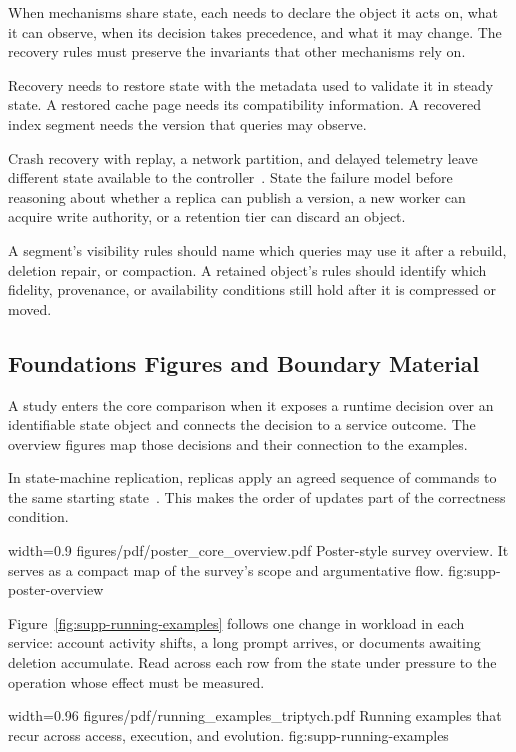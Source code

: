 When mechanisms share state, each needs to declare the object it acts on, what it can observe, when its decision takes precedence, and what it may change. The recovery rules must preserve the invariants that other mechanisms rely on.

Recovery needs to restore state with the metadata used to validate it in steady state. A restored cache page needs its compatibility information. A recovered index segment needs the version that queries may observe.

Crash recovery with replay, a network partition, and delayed telemetry leave different state available to the controller~\cite{chandy1985snapshot,corbett2012spanner,ongaro2014raft,mao2023morphstream,zhao2024recovery,wang2026candor,zhang2026flowrag}. State the failure model before reasoning about whether a replica can publish a version, a new worker can acquire write authority, or a retention tier can discard an object.

A segment's visibility rules should name which queries may use it after a rebuild, deletion repair, or compaction. A retained object's rules should identify which fidelity, provenance, or availability conditions still hold after it is compressed or moved.

\subsection{Foundations Figures and Boundary Material}

A study enters the core comparison when it exposes a runtime decision over an identifiable state object and connects the decision to a service outcome. The overview figures map those decisions and their connection to the examples.

In state-machine replication, replicas apply an agreed sequence of commands to the same starting state~\cite{schneider1990state}. This makes the order of updates part of the correctness condition.

\inlinefigurewithcaption
  {width=0.9\linewidth}
  {figures/pdf/poster_core_overview.pdf}
  {Poster-style survey overview. It serves as a compact map of the survey's scope and argumentative flow.}
  {fig:supp-poster-overview}

Figure~\ref{fig:supp-running-examples} follows one change in workload in each service: account activity shifts, a long prompt arrives, or documents awaiting deletion accumulate. Read across each row from the state under pressure to the operation whose effect must be measured.

\inlinefigurewithcaption
  {width=0.96\linewidth}
  {figures/pdf/running_examples_triptych.pdf}
  {Running examples that recur across access, execution, and evolution.}
  {fig:supp-running-examples}
